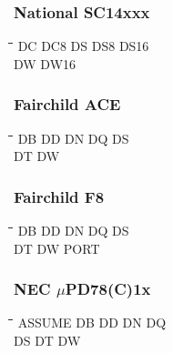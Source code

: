 \subsubsection{National SC14xxx}
{\tt\begin{tabbing}
\hspace{3cm}\=\hspace{3cm}\=\hspace{3cm}\=\hspace{3cm}\=\kill
DC         \> DC8         \> DS          \> DS8         \> DS16 \\
DW         \> DW16 \\
\end{tabbing}}

\subsubsection{Fairchild ACE}
{\tt\begin{tabbing}
\hspace{3cm}\=\hspace{3cm}\=\hspace{3cm}\=\hspace{3cm}\=\kill
DB          \> DD          \> DN         \> DQ          \> DS \\
DT          \> DW \\
\end{tabbing}}

\subsubsection{Fairchild F8}
{\tt\begin{tabbing}
\hspace{3cm}\=\hspace{3cm}\=\hspace{3cm}\=\hspace{3cm}\=\kill
DB          \> DD          \> DN         \> DQ          \> DS \\
DT          \> DW          \> PORT \\
\end{tabbing}}

\subsubsection{NEC $\mu$PD78(C)1x}
{\tt\begin{tabbing}
\hspace{3cm}\=\hspace{3cm}\=\hspace{3cm}\=\hspace{3cm}\=\kill
ASSUME     \> DB          \> DD          \> DN          \> DQ \\
DS         \> DT          \> DW \\
\end{tabbing}}

